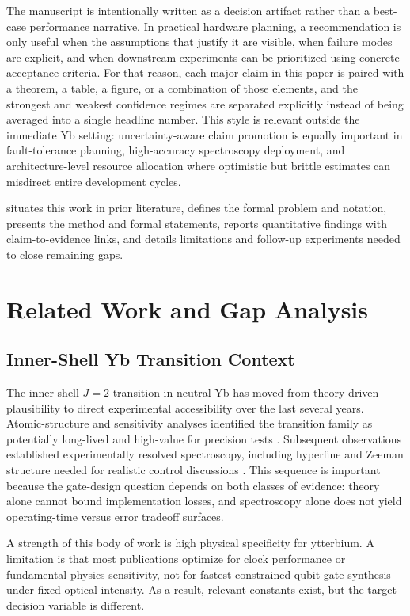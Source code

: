 \documentclass{article} %
\begin{document}
The manuscript is intentionally written as a decision artifact rather than a best-case performance narrative. In practical hardware planning, a recommendation is only useful when the assumptions that justify it are visible, when failure modes are explicit, and when downstream experiments can be prioritized using concrete acceptance criteria. For that reason, each major claim in this paper is paired with a theorem, a table, a figure, or a combination of those elements, and the strongest and weakest confidence regimes are separated explicitly instead of being averaged into a single headline number. This style is relevant outside the immediate Yb setting: uncertainty-aware claim promotion is equally important in fault-tolerance planning, high-accuracy spectroscopy deployment, and architecture-level resource allocation where optimistic but brittle estimates can misdirect entire development cycles.

 situates this work in prior literature,  defines the formal problem and notation,  presents the method and formal statements,  reports quantitative findings with claim-to-evidence links, and  details limitations and follow-up experiments needed to close remaining gaps.

\section{Related Work and Gap Analysis}
\label{sec:related}
\subsection{Inner-Shell Yb Transition Context}
The inner-shell $J=2$ transition in neutral Yb has moved from theory-driven plausibility to direct experimental accessibility over the last several years. Atomic-structure and sensitivity analyses identified the transition family as potentially long-lived and high-value for precision tests \citep{S01,S06}. Subsequent observations established experimentally resolved spectroscopy, including hyperfine and Zeeman structure needed for realistic control discussions \citep{S02,S03,S04}. This sequence is important because the gate-design question depends on both classes of evidence: theory alone cannot bound implementation losses, and spectroscopy alone does not yield operating-time versus error tradeoff surfaces.

A strength of this body of work is high physical specificity for ytterbium. A limitation is that most publications optimize for clock performance or fundamental-physics sensitivity, not for fastest constrained qubit-gate synthesis under fixed optical intensity. As a result, relevant constants exist, but the target decision variable is different.
\end{document}
